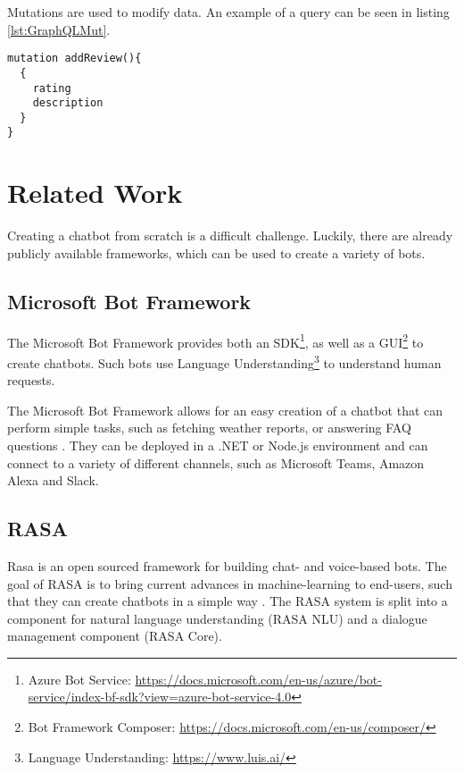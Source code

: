 Mutations are used to modify data. An example of a query can be seen in listing \ref{lst:GraphQLMut}.
\begin{lstlisting}[caption={Example of a GraphQL Mutation},captionpos=b,label={lst:GraphQLMut}]
mutation addReview(){
  {
	rating 
	description
  }
}
\end{lstlisting}


\section{Related Work} \label{lab:relWork}

Creating a chatbot from scratch is a difficult challenge. Luckily, there are already publicly available frameworks, which can be used to create a variety of bots.

\subsection{Microsoft Bot Framework}
The Microsoft Bot Framework provides both an SDK\footnote{Azure Bot Service: \href{https://docs.microsoft.com/en-us/azure/bot-service/index-bf-sdk?view=azure-bot-service-4.0}{https://docs.microsoft.com/en-us/azure/bot-service/index-bf-sdk?view=azure-bot-service-4.0}}, as well as a GUI\footnote{Bot Framework Composer: \href{https://docs.microsoft.com/en-us/composer/}{https://docs.microsoft.com/en-us/composer/}} to create chatbots. Such bots use Language Understanding\footnote{Language Understanding: \href{https://www.luis.ai/}{https://www.luis.ai/}} to understand human requests.

The Microsoft Bot Framework allows for an easy creation of a chatbot that can perform simple tasks, such as fetching weather reports, or answering FAQ questions \cite{CaWh14}. They can be deployed in a .NET or Node.js environment and can connect to a variety of different channels, such as Microsoft Teams, Amazon Alexa and Slack.

\subsection{RASA}
Rasa is an open sourced framework for building chat- and voice-based bots. The goal of RASA is to bring current advances in machine-learning to end-users, such that they can create chatbots in a simple way \cite{BFPN17}. The RASA system is split into a component for natural language understanding (RASA NLU) and a dialogue management component (RASA Core).


